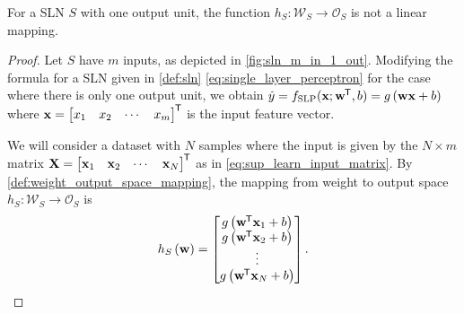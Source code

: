 \begin{theorem}
    \label{thm:sln_one_output}
    For a SLN $S$ with one output unit, the function $h_S: \mathcal{W}_S \rightarrow \mathcal{O}_S$ is not a linear mapping.
\end{theorem}
\begin{proof}
    Let $S$ have $m$ inputs, as depicted in \ref{fig:sln_m_in_1_out}.
    Modifying the formula for a SLN given in \ref{def:sln} \ref{eq:single_layer_perceptron} for the case where there is only one output unit, we obtain
    $\hat{y} = f_\text{SLP}(\mathbf{x}; \mathbf{w}^{\mkern-1.5mu\mathsf{T}}, b) = g\left(\mathbf{w} \mathbf{x} + b\right)$
    where
    $\mathbf{x} = \begin{bmatrix}
        x_1 & x_2 & \cdots & x_m
    \end{bmatrix}^{\mkern-1.5mu\mathsf{T}}$
    is the input feature vector.

    We will consider a dataset with $N$ samples where the input is given by the $N\times m$ matrix
    $\mathbf{X} = \begin{bmatrix}
        \mathbf{x}_1 & \mathbf{x}_2 & \cdots & \mathbf{x}_N
    \end{bmatrix}^{\mkern-1.5mu\mathsf{T}}$
    as in \ref{eq:sup_learn_input_matrix}.
    By \ref{def:weight_output_space_mapping}, the mapping from weight to output space $h_S: \mathcal{W}_S \rightarrow \mathcal{O}_S$ is
    \begin{equation*}
        h_S \left( \mathbf{w} \right)
        = \begin{bmatrix}
            g \left( \mathbf{w}^{\mkern-1.5mu\mathsf{T}} \mathbf{x}_1 + b \right) \\
            g \left( \mathbf{w}^{\mkern-1.5mu\mathsf{T}} \mathbf{x}_2 + b \right) \\
            \vdots \\
            g \left( \mathbf{w}^{\mkern-1.5mu\mathsf{T}} \mathbf{x}_N + b \right) \\
        \end{bmatrix}.
    \end{equation*}


\end{proof}
